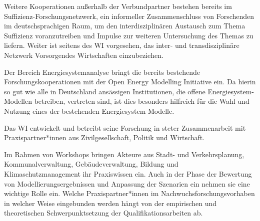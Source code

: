 Weitere Kooperationen außerhalb der Verbundpartner bestehen bereits im Suffizienz-Forschungsnetzwerk, ein informeller Zusammenschluss von Forschenden im deutschsprachigen Raum, um den interdisziplinären Austausch zum Thema Suffizienz voranzutreiben und Impulse zur weiteren Untersuchung des Themas zu liefern. Weiter ist seitens des WI vorgesehen, das inter- und transdisziplinäre Netzwerk Vorsorgendes Wirtschaften einzubeziehen.

Der Bereich Energiesystemanalyse bringt die bereits bestehende Forschungskooperationen mit der Open Energy Modelling Initiative \cite{openmod} ein. Da hierin so gut wie alle in Deutschland ansässigen Institutionen, die offene Energiesystem-Modellen betreiben, vertreten sind, ist dies besonders hilfreich für die Wahl und Nutzung eines der bestehenden Energiesystem-Modelle. 

Das WI entwickelt und betreibt seine Forschung in steter Zusammenarbeit mit Praxispartner*innen aus Zivilgesellschaft, Politik und Wirtschaft. 


Im Rahmen von Workshops bringen Akteure aus Stadt- und Verkehrsplanung, Kommunalverwaltung, Gebäudeverwaltung, Bildung und Klimaschutzmanagement ihr Praxiswissen ein. Auch in der Phase der Bewertung von Modellierungsergebnissen und Anpassung der Szenarien ein nehmen sie eine wichtige Rolle ein. Welche Praxispartner*innen im Nachwuchsforschungsvorhaben in welcher Weise eingebunden werden hängt von der empirischen und theoretischen Schwerpunktsetzung der Qualifikationsarbeiten ab.




